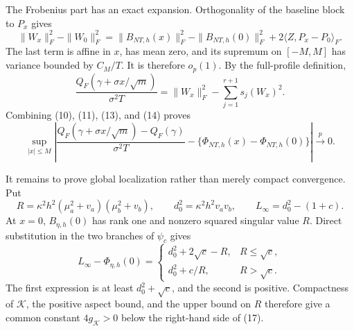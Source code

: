 The Frobenius part has an exact expansion.  Orthogonality of the baseline block to \(P_x\) gives
\[
 \|W_x\|_F^2-\|W_0\|_F^2
 =\|B_{NT,h}(x)\|_F^2-\|B_{NT,h}(0)\|_F^2
 +2\langle Z,P_x-P_0\rangle_F. \tag{14}
\]
The last term is affine in \(x\), has mean zero, and its supremum on \([-M,M]\) has variance bounded by \(C_M/T\).  It is therefore \(o_p(1)\).  By the full-profile definition,
\[
 \frac{Q_F(\gamma+\sigma x/\sqrt m)}{\sigma^2T}
 =\|W_x\|_F^2-\sum_{j=1}^{r+1}s_j(W_x)^2.
\]
Combining (10), (11), (13), and (14) proves
\[
 \sup_{|x|\leq M}\left|
 \frac{Q_F(\gamma+\sigma x/\sqrt m)-Q_F(\gamma)}{\sigma^2T}
 -\{\Phi_{NT,h}(x)-\Phi_{NT,h}(0)\}
 \right|\xrightarrow{p}0. \tag{15}
\]

It remains to prove global localization rather than merely compact convergence.  Put
\[
 R=\kappa^2h^2(\mu_a^2+v_a)(\mu_b^2+v_b),
 \qquad d_0^2=\kappa^2h^2v_av_b,
 \qquad L_\infty=d_0^2-(1+c). \tag{16}
\]
At \(x=0\), \(B_{\eta,h}(0)\) has rank one and nonzero squared singular value \(R\).  Direct substitution in the two branches of \(\psi_c\) gives
\[
 L_\infty-\Phi_{\eta,h}(0)=
 \begin{cases}
 d_0^2+2\sqrt c-R,&R\leq\sqrt c,\\
 d_0^2+c/R,&R>\sqrt c.
 \end{cases} \tag{17}
\]
The first expression is at least \(d_0^2+\sqrt c\), and the second is positive.  Compactness of \(\mathcal K\), the positive aspect bound, and the upper bound on \(R\) therefore give a common constant \(4g_{\mathcal K}>0\) below the right-hand side of (17).

